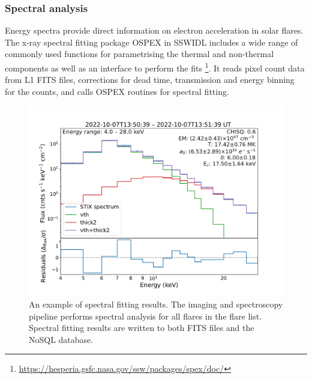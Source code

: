 \documentclass{aa}
\begin{document}
\subsubsection{Spectral analysis}
Energy spectra provide direct information on electron acceleration in solar flares. 
The x-ray spectral fitting package OSPEX in SSWIDL includes a wide range of commonly used 
functions for parametrising the thermal
and non-thermal components as well as an interface to perform
the fits \footnote{\url{https://hesperia.gsfc.nasa.gov/ssw/packages/spex/doc/}}.
It reads pixel count data from L1 FITS files, corrections for dead time, transmission 
and energy binning for the counts,  
and calls  OSPEX routines for spectral fitting. 
\begin{figure}[h]
  \centering
  \includegraphics[width=0.9\linewidth]{figures/ospex.pdf}
  \caption{ 
    An example of spectral fitting results. The imaging and spectroscopy pipeline performs
    spectral analysis for all flares in the flare list. Spectral fitting results are written to both FITS files and 
    the NoSQL database.
   }
  \label{fig:ospex}
\end{figure}
\end{document}
